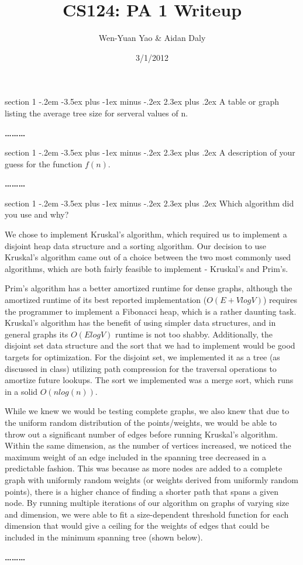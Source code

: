 \documentclass[12pt]{article}
\makeatletter
\newenvironment{problem}{\@startsection
       {section}
       {1}
       {-.2em}
       {-3.5ex plus -1ex minus -.2ex}
       {2.3ex plus .2ex}
       {\pagebreak[3]%
       \large\bf\noindent{Problem }
       }
       }
       {%
       \begin{center}\large\bf \ldots\ldots\ldots\end{center}}
\makeatother
\begin{document}
\title{CS124: PA 1 Writeup}
\author{Wen-Yuan Yao & Aidan Daly}
\date{3/1/2012}
\thispagestyle{empty}

\begin{problem}{}
A table or graph listing the average tree size for serveral values of n.

\end{problem}

\begin{problem}{}
A description of your guess for the function $f(n)$.

\end{problem}

\begin{problem}{}
Which algorithm did you use and why?

We chose to implement Kruskal's algorithm, which required us to implement a disjoint heap data structure and a sorting algorithm.  Our decision to use Kruskal's algorithm came out of a choice between the two most commonly used algorithms, which are both fairly feasible to implement - Kruskal's and Prim's.

Prim's algorithm has a better amortized runtime for dense graphs, although the amortized runtime of its best reported implementation ($O(E + VlogV)$) requires the programmer to implement a Fibonacci heap, which is a rather daunting task.  Kruskal's algorithm has the benefit of using simpler data structures, and in general graphs its $O(ElogV)$ runtime is not too shabby.  Additionally, the disjoint set data structure and the sort that we had to implement would be good targets for optimization.  For the disjoint set, we implemented it as a tree (as discussed in class) utilizing path compression for the traversal operations to amortize future lookups.  The sort we implemented was a merge sort, which runs in a solid $O(nlog(n))$.

While we knew we would be testing complete graphs, we also knew that due to the uniform random distribution of the points/weights, we would be able to throw out a significant number of edges before running Kruskal's algorithm.  Within the same dimension, as the number of vertices increased, we noticed the maximum weight of an edge included in the spanning tree decreased in a predictable fashion.  This was because as more nodes are added to a complete graph with uniformly random weights (or weights derived from uniformly random points), there is a higher chance of finding a shorter path that spans a given node.  By running multiple iterations of our algorithm on graphs of varying size and dimension, we were able to fit a size-dependent threshold function for each dimension that would give a ceiling for the weights of edges that could be included in the minimum spanning tree (shown below).


\end{problem}
\end{document}
